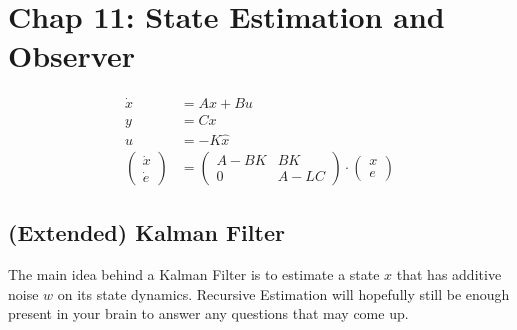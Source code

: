 \section{Chap 11: State Estimation and Observer}
\begin{align*}
    \Dot{x}         & = Ax + Bu                          \\
    y               & = Cx                               \\
    u               & = -K\hat{x}                        \\
    \begin{pmatrix}
        \Dot{x} \\
        \Dot{e}
    \end{pmatrix} & = \begin{pmatrix}
                          A-BK & BK   \\
                          0    & A-LC
                      \end{pmatrix} \cdot \begin{pmatrix}
                                              x \\
                                              e
                                          \end{pmatrix}
\end{align*}
\subsection{(Extended) Kalman Filter}
The main idea behind a Kalman Filter is to estimate a state $x$ that has additive noise $w$ on its state dynamics. Recursive Estimation will hopefully still be enough present in your brain to answer any questions that may come up.

